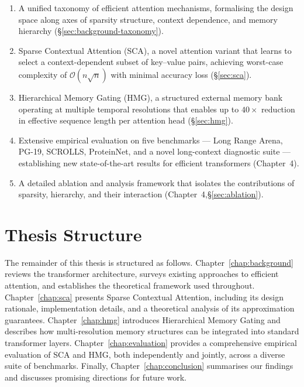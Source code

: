 \documentclass[12pt,a4paper,oneside]{book}
\begin{document}
\begin{enumerate}[label=\textbf{C\arabic*}, leftmargin=2.5em]
  \item A unified taxonomy of efficient attention mechanisms, formalising the design space
    along axes of sparsity structure, context dependence, and memory hierarchy \hfill
    (\S\ref{sec:background-taxonomy}).

  \item Sparse Contextual Attention (SCA), a novel attention variant that learns to select
    a context-dependent subset of key--value pairs, achieving worst-case complexity of
    $\mathcal{O}(n\sqrt{n})$ with minimal accuracy loss \hfill (\S\ref{sec:sca}).

  \item Hierarchical Memory Gating (HMG), a structured external memory bank operating at
    multiple temporal resolutions that enables up to $40\times$ reduction in effective
    sequence length per attention head \hfill (\S\ref{sec:hmg}).

  \item Extensive empirical evaluation on five benchmarks — Long Range Arena, PG-19,
    SCROLLS, ProteinNet, and a novel long-context diagnostic suite — establishing new
    state-of-the-art results for efficient transformers \hfill (Chapter~4).

  \item A detailed ablation and analysis framework that isolates the contributions of
    sparsity, hierarchy, and their interaction \hfill (Chapter~4,\S\ref{sec:ablation}).
\end{enumerate}

\section{Thesis Structure}

The remainder of this thesis is structured as follows.
Chapter~\ref{chap:background} reviews the transformer architecture, surveys existing
approaches to efficient attention, and establishes the theoretical framework used throughout.
Chapter~\ref{chap:sca} presents Sparse Contextual Attention, including its design rationale,
implementation details, and a theoretical analysis of its approximation guarantees.
Chapter~\ref{chap:hmg} introduces Hierarchical Memory Gating and describes how multi-resolution
memory structures can be integrated into standard transformer layers.
Chapter~\ref{chap:evaluation} provides a comprehensive empirical evaluation of SCA and HMG,
both independently and jointly, across a diverse suite of benchmarks. Finally,
Chapter~\ref{chap:conclusion} summarises our findings and discusses promising directions for
future work.
\end{document}
